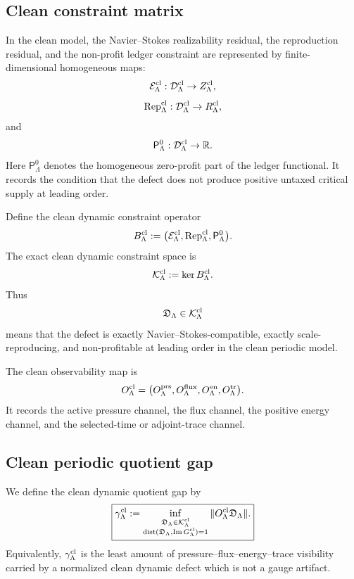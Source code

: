 \documentclass[11pt]{article}
\numberwithin{equation}{section}
\begin{document}
\subsection{Clean constraint matrix}

In the clean model, the Navier--Stokes realizability residual, the
reproduction residual, and the non-profit ledger constraint are represented
by finite-dimensional homogeneous maps:
\[
        \mathcal E_\Lambda^{\rm cl}:
        \mathcal D_\Lambda^{\rm cl}\to Z_\Lambda^{\rm cl},
\]
\[
        \operatorname{Rep}_\Lambda^{\rm cl}:
        \mathcal D_\Lambda^{\rm cl}\to R_\Lambda^{\rm cl},
\]
and
\[
        \mathsf P_\Lambda^{0}:
        \mathcal D_\Lambda^{\rm cl}\to \mathbb R .
\]
Here \(\mathsf P_\Lambda^{0}\) denotes the homogeneous zero-profit part of
the ledger functional.  It records the condition that the defect does not
produce positive untaxed critical supply at leading order.

Define the clean dynamic constraint operator
\[
        B_\Lambda^{\rm cl}
        :=
        \bigl(
        \mathcal E_\Lambda^{\rm cl},
        \operatorname{Rep}_\Lambda^{\rm cl},
        \mathsf P_\Lambda^{0}
        \bigr).
\]
The exact clean dynamic constraint space is
\[
        \mathcal K_\Lambda^{\rm cl}
        :=
        \ker B_\Lambda^{\rm cl}.
\]
Thus
\[
        \mathfrak D_\Lambda\in\mathcal K_\Lambda^{\rm cl}
\]
means that the defect is exactly Navier--Stokes-compatible, exactly
scale-reproducing, and non-profitable at leading order in the clean
periodic model.

The clean observability map is
\[
        O_\Lambda^{\rm cl}
        =
        \bigl(
        O_\Lambda^{\rm prs},
        O_\Lambda^{\rm flux},
        O_\Lambda^{\rm en},
        O_\Lambda^{\rm tr}
        \bigr).
\]
It records the active pressure channel, the flux channel, the positive
energy channel, and the selected-time or adjoint-trace channel.

\subsection{Clean periodic quotient gap}

We define the clean dynamic quotient gap by
\[
\boxed{
        \gamma_\Lambda^{\rm cl}
        :=
        \inf_{\substack{
        \mathfrak D_\Lambda\in\mathcal K_\Lambda^{\rm cl}\\
        \operatorname{dist}
        (\mathfrak D_\Lambda,\operatorname{Im}G_\Lambda^{\rm cl})=1
        }}
        \|O_\Lambda^{\rm cl}\mathfrak D_\Lambda\| .
}
\]
Equivalently, \(\gamma_\Lambda^{\rm cl}\) is the least amount of
pressure--flux--energy--trace visibility carried by a normalized clean
dynamic defect which is not a gauge artifact.
\end{document}
